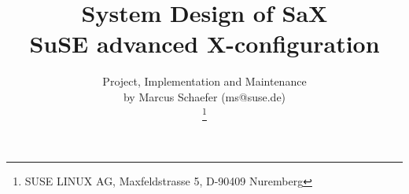 \documentclass[11pt, english, a4paper, headsepline, footsepline,
BCOR1.5cm, DIV16, bigheadings, bibtotoc, idxtotoc, headinclude,
footexclude, abstracton]{scrbook}
\title{
  System Design of SaX\\
  SuSE advanced X-configuration
}
\author{
  Project, Implementation and Maintenance\\ 
  by Marcus Schaefer (ms@suse.de)\\
  \thanks{
  SUSE LINUX AG, Maxfeldstrasse 5, D-90409 Nuremberg
  }
}
\date{
 \vspace{1cm}
 \epsfig{
   file=pictures/logo.ps,width=4cm
 }\\
 \vspace{1.5cm}
 \vspace{3cm}
 \begin{tabbing}
  \hspace{2.6cm} Author: \quad\= Marcus Schaefer\\
  \hspace{2.6cm} Datum:\>  \today\\
 \end{tabbing}
}
\begin{document}
\dominitoc



\maketitle

\tableofcontents








\begin{thebibliography}{99}
 
\end{thebibliography}




\end{document}
